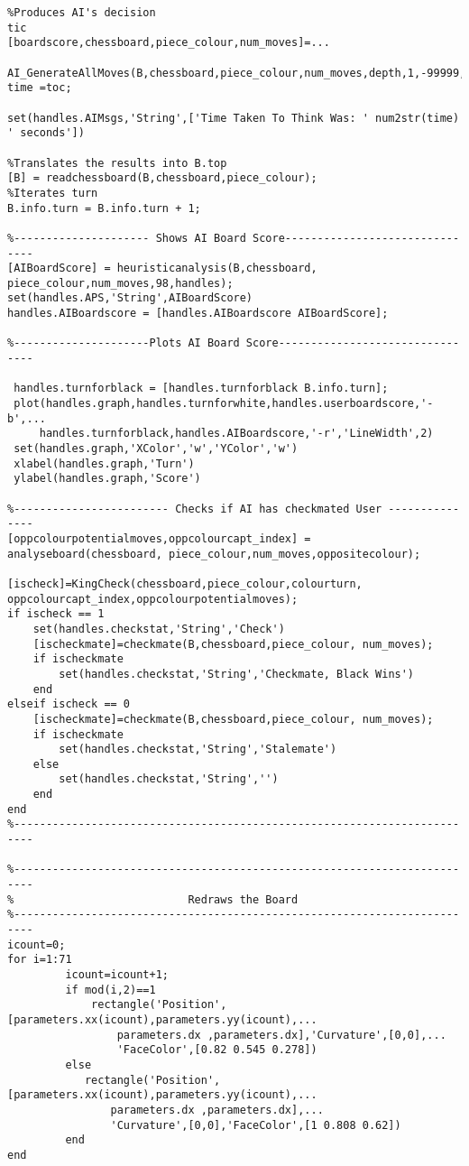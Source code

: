 \documentclass{article}
\begin{document}
\begin{lstlisting}
%Produces AI's decision
tic
[boardscore,chessboard,piece_colour,num_moves]=...
    AI_GenerateAllMoves(B,chessboard,piece_colour,num_moves,depth,1,-99999,99999,handles);
time =toc;

set(handles.AIMsgs,'String',['Time Taken To Think Was: ' num2str(time) ' seconds'])

%Translates the results into B.top
[B] = readchessboard(B,chessboard,piece_colour);
%Iterates turn
B.info.turn = B.info.turn + 1;

%--------------------- Shows AI Board Score-------------------------------
[AIBoardScore] = heuristicanalysis(B,chessboard, piece_colour,num_moves,98,handles);
set(handles.APS,'String',AIBoardScore)
handles.AIBoardscore = [handles.AIBoardscore AIBoardScore];

%---------------------Plots AI Board Score--------------------------------

 handles.turnforblack = [handles.turnforblack B.info.turn];
 plot(handles.graph,handles.turnforwhite,handles.userboardscore,'-b',...
     handles.turnforblack,handles.AIBoardscore,'-r','LineWidth',2)
 set(handles.graph,'XColor','w','YColor','w')
 xlabel(handles.graph,'Turn')
 ylabel(handles.graph,'Score')

%------------------------ Checks if AI has checkmated User ---------------
[oppcolourpotentialmoves,oppcolourcapt_index] = analyseboard(chessboard, piece_colour,num_moves,oppositecolour);

[ischeck]=KingCheck(chessboard,piece_colour,colourturn, oppcolourcapt_index,oppcolourpotentialmoves);
if ischeck == 1
    set(handles.checkstat,'String','Check')
    [ischeckmate]=checkmate(B,chessboard,piece_colour, num_moves);
    if ischeckmate
        set(handles.checkstat,'String','Checkmate, Black Wins')
    end
elseif ischeck == 0
    [ischeckmate]=checkmate(B,chessboard,piece_colour, num_moves);
    if ischeckmate
        set(handles.checkstat,'String','Stalemate')
    else
        set(handles.checkstat,'String','')
    end
end
%-------------------------------------------------------------------------

%-------------------------------------------------------------------------
%                           Redraws the Board
%-------------------------------------------------------------------------
icount=0;
for i=1:71
         icount=icount+1;
         if mod(i,2)==1
             rectangle('Position',[parameters.xx(icount),parameters.yy(icount),...
                 parameters.dx ,parameters.dx],'Curvature',[0,0],...
                 'FaceColor',[0.82 0.545 0.278])
         else
            rectangle('Position',[parameters.xx(icount),parameters.yy(icount),...
                parameters.dx ,parameters.dx],...
                'Curvature',[0,0],'FaceColor',[1 0.808 0.62])             
         end
end


\end{lstlisting}
\end{document}
